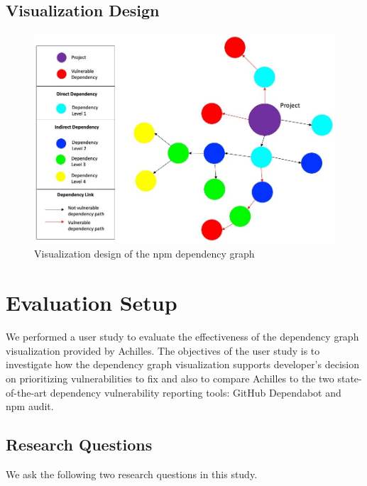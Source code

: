 \documentclass[conference]{IEEEtran}
\begin{document}
	
	\subsection{Visualization Design}
	
		\begin{figure}[tb]
		\centering
		\includegraphics[width=1.5\columnwidth]{Figures/Viz-concept-1.jpg}
		\caption{Visualization design of the npm dependency graph}
		\label{fig:viz-concept}
	\end{figure}
	
	\section{Evaluation Setup}
	We performed a user study to evaluate the effectiveness of the dependency graph visualization provided by Achilles.
	The objectives of the user study is to investigate how the dependency graph visualization supports developer’s decision on prioritizing vulnerabilities to fix and also to compare Achilles to the two state-of-the-art dependency vulnerability reporting tools: GitHub Dependabot and npm audit. 
	
	\subsection{Research Questions}
	We ask the following two research questions in this study.
	
\end{document}
